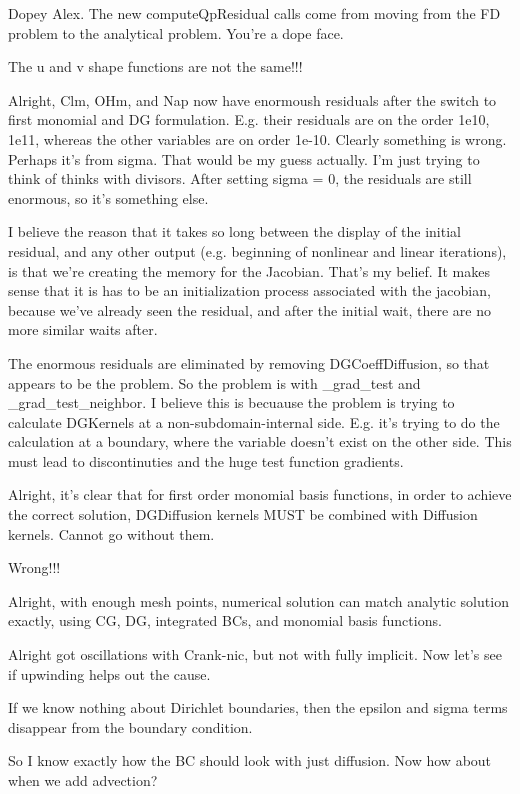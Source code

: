 {Dopey Alex. The new computeQpResidual calls come from moving from the FD problem to the analytical problem. You're a dope face.

The u and v shape functions are not the same!!!

Alright, Clm, OHm, and Nap now have enormoush residuals after the switch to first monomial and DG formulation. E.g. their residuals are on the order 1e10, 1e11, whereas the other variables are on order 1e-10. Clearly something is wrong. Perhaps it's from sigma. That would be my guess actually. I'm just trying to think of thinks with divisors. After setting sigma = 0, the residuals are still enormous, so it's something else.

I believe the reason that it takes so long between the display of the initial residual, and any other output (e.g. beginning of nonlinear and linear iterations), is that we're creating the memory for the Jacobian. That's my belief. It makes sense that it is has to be an initialization process associated with the jacobian, because we've already seen the residual, and after the initial wait, there are no more similar waits after.

The enormous residuals are eliminated by removing DGCoeffDiffusion, so that appears to be the problem. So the problem is with _grad_test and _grad_test_neighbor. I believe this is becuause the problem is trying to calculate DGKernels at a non-subdomain-internal side. E.g. it's trying to do the calculation at a boundary, where the variable doesn't exist on the other side. This must lead to discontinuties and the huge test function gradients.

Alright, it's clear that for first order monomial basis functions, in order to achieve the correct solution, DGDiffusion kernels MUST be combined with Diffusion kernels. Cannot go without them.

Wrong!!!

Alright, with enough mesh points, numerical solution can match analytic solution exactly, using CG, DG, integrated BCs, and monomial basis functions.

Alright got oscillations with Crank-nic, but not with fully implicit. Now let's see if upwinding helps out the cause.

If we know nothing about Dirichlet boundaries, then the epsilon and sigma terms disappear from the boundary condition.

So I know exactly how the BC should look with just diffusion. Now how about when we add advection?

}
